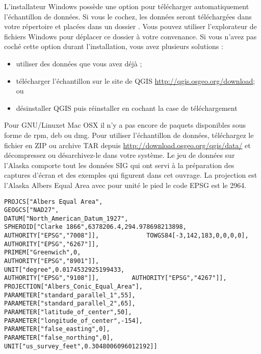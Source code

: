 \win L'installateur Windows possède une option pour télécharger automatiquement l'échantillon de données. Si vous le cochez, les données seront téléchargées dans votre répertoire  et placées dans un dossier . Vous pouvez utiliser l'explorateur de fichiers Windows pour déplacer ce dossier à votre convenance. Si vous n'avez pas coché cette option durant l'installation, vous avez plusieurs solutions : 
\begin{itemize} 
\item utiliser des données que vous avez déjà ;
\item télécharger l'échantillon sur le site de QGIS \url{http://qgis.osgeo.org/download}; ou 
\item désinstaller QGIS  puis réinstaller en cochant la case de téléchargement 
\end{itemize}

\nix \osx Pour GNU/Linuxet Mac OSX il n'y a pas encore de paquets disponibles sous forme de rpm, deb ou dmg. Pour utiliser l'échantillon de données, téléchargez le fichier  en ZIP ou archive TAR depuis  \url{http://download.osgeo.org/qgis/data/} et décompressez ou désarchivez-le dans votre système. Le jeu de données sur l'Alaska comporte tout les données SIG qui ont servi à la préparation des captures d'écran et des exemples qui figurent dans cet ouvrage. La projection est l'Alaska Albers Equal Area avec pour unité le pied le code EPSG est le 2964.

\begin{verbatim}
PROJCS["Albers Equal Area",   
GEOGCS["NAD27",   
DATUM["North_American_Datum_1927",   
SPHEROID["Clarke 1866",6378206.4,294.978698213898,   
AUTHORITY["EPSG","7008"]],             TOWGS84[-3,142,183,0,0,0,0],             AUTHORITY["EPSG","6267"]],   
PRIMEM["Greenwich",0,   
AUTHORITY["EPSG","8901"]],   
UNIT["degree",0.0174532925199433,   
AUTHORITY["EPSG","9108"]],         AUTHORITY["EPSG","4267"]],   
PROJECTION["Albers_Conic_Equal_Area"],   
PARAMETER["standard_parallel_1",55],   
PARAMETER["standard_parallel_2",65],   
PARAMETER["latitude_of_center",50],   
PARAMETER["longitude_of_center",-154],   
PARAMETER["false_easting",0],   
PARAMETER["false_northing",0],   
UNIT["us_survey_feet",0.3048006096012192]] \end{verbatim}


